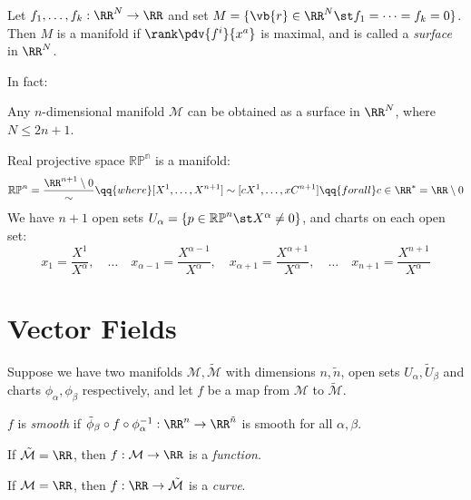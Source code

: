 \documentclass{jknotes}
\begin{document}
\begin{eg}
    Let \(f_1,\dots,f_k:\RR^N\rightarrow\RR\) and set \(M = \{\vb{r}\in\RR^N\st f_1 = \dots = f_k = 0\}\). Then \(M\) is a manifold if \(\rank\pdv{f^i}{x^a}\) is maximal, and is called a \emph{surface} in \(\RR^N\).
\end{eg}
In fact:
\begin{theorem}[Whitney]
    Any \(n\)-dimensional manifold \(\mathcal{M}\) can be obtained as a surface in \(\RR^N\), where \(N \le 2n+1\).
\end{theorem}
\begin{eg}
    Real projective space \(\mathbb{RP^n}\) is a manifold:
    \begin{equation}
        \mathbb{RP}^n = \frac{\RR^{n+1}\setminus{0}}{\sim} \qq{where} [X^1,\dots,X^{n+1}] \sim [cX^1,\dots,xC^{n+1}] \qq{for all} c \in \RR^* = \RR \setminus {0}
    \end{equation}
    We have \(n+1\) open sets \(U_\alpha = \{p\in\mathbb{RP}^n\st X^\alpha \ne 0\}\), and charts on each open set:
    \begin{equation}
        x_1 = \frac{X^1}{X^\alpha},\quad\dots\quad x_{\alpha-1} = \frac{X^{\alpha-1}}{X^\alpha},\quad x_{\alpha+1} = \frac{X^{\alpha+1}}{X^\alpha},\quad \dots\quad x_{n+1} = \frac{X^{n+1}}{X^\alpha}
    \end{equation}
\end{eg}

\section{Vector Fields}

Suppose we have two manifolds \(\mathcal{M},\tilde{\mathcal{M}}\) with dimensions \(n,\tilde{n}\), open sets \(U_\alpha,\tilde{U}_\beta\) and charts \(\phi_\alpha,\phi_\beta\) respectively, and let \(f\) be a map from \(\mathcal{M}\) to \(\tilde{\mathcal{M}}\).

\begin{defn}
    \(f\) is \emph{smooth} if \(\tilde{\phi}_\beta\circ f\circ\phi_\alpha^{-1}:\RR^n\rightarrow\RR^{\tilde{n}}\) is smooth for all \(\alpha, \beta\).
\end{defn}

\begin{defn}
    If \(\tilde{\mathcal{M}}=\RR\), then \(f:\mathcal{M}\rightarrow\RR\) is a \emph{function}.
\end{defn}

\begin{defn}
    If \(\mathcal{M} = \RR\), then \(f:\RR\rightarrow\tilde{\mathcal{M}}\) is a \emph{curve}.
\end{defn}
\end{document}
